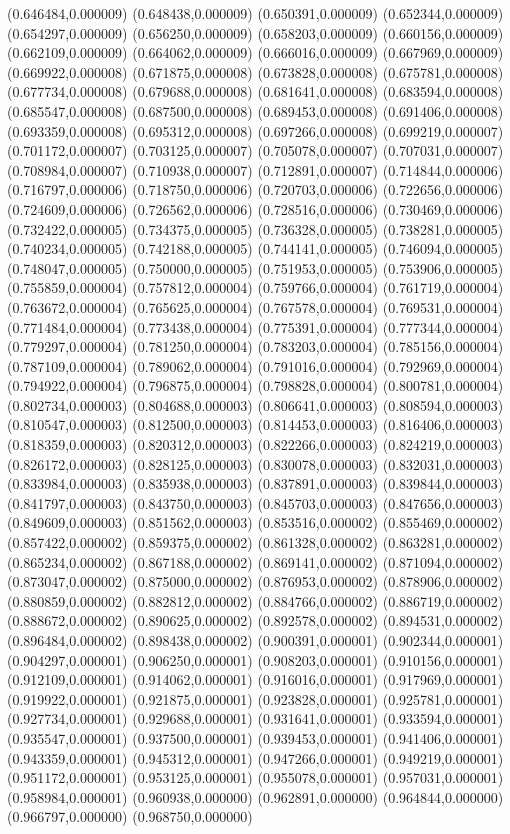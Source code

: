 {(0.646484,0.000009) (0.648438,0.000009) (0.650391,0.000009) (0.652344,0.000009) (0.654297,0.000009) (0.656250,0.000009) (0.658203,0.000009) (0.660156,0.000009) (0.662109,0.000009) (0.664062,0.000009) (0.666016,0.000009) (0.667969,0.000009) (0.669922,0.000008) (0.671875,0.000008) (0.673828,0.000008) (0.675781,0.000008) (0.677734,0.000008) (0.679688,0.000008) (0.681641,0.000008) (0.683594,0.000008) (0.685547,0.000008) (0.687500,0.000008) (0.689453,0.000008) (0.691406,0.000008) (0.693359,0.000008) (0.695312,0.000008) (0.697266,0.000008) (0.699219,0.000007) (0.701172,0.000007) (0.703125,0.000007) (0.705078,0.000007) (0.707031,0.000007) (0.708984,0.000007) (0.710938,0.000007) (0.712891,0.000007) (0.714844,0.000006) (0.716797,0.000006) (0.718750,0.000006) (0.720703,0.000006) (0.722656,0.000006) (0.724609,0.000006) (0.726562,0.000006) (0.728516,0.000006) (0.730469,0.000006) (0.732422,0.000005) (0.734375,0.000005) (0.736328,0.000005) (0.738281,0.000005) (0.740234,0.000005) (0.742188,0.000005) (0.744141,0.000005) (0.746094,0.000005) (0.748047,0.000005) (0.750000,0.000005) (0.751953,0.000005) (0.753906,0.000005) (0.755859,0.000004) (0.757812,0.000004) (0.759766,0.000004) (0.761719,0.000004) (0.763672,0.000004) (0.765625,0.000004) (0.767578,0.000004) (0.769531,0.000004) (0.771484,0.000004) (0.773438,0.000004) (0.775391,0.000004) (0.777344,0.000004) (0.779297,0.000004) (0.781250,0.000004) (0.783203,0.000004) (0.785156,0.000004) (0.787109,0.000004) (0.789062,0.000004) (0.791016,0.000004) (0.792969,0.000004) (0.794922,0.000004) (0.796875,0.000004) (0.798828,0.000004) (0.800781,0.000004) (0.802734,0.000003) (0.804688,0.000003) (0.806641,0.000003) (0.808594,0.000003) (0.810547,0.000003) (0.812500,0.000003) (0.814453,0.000003) (0.816406,0.000003) (0.818359,0.000003) (0.820312,0.000003) (0.822266,0.000003) (0.824219,0.000003) (0.826172,0.000003) (0.828125,0.000003) (0.830078,0.000003) (0.832031,0.000003) (0.833984,0.000003) (0.835938,0.000003) (0.837891,0.000003) (0.839844,0.000003) (0.841797,0.000003) (0.843750,0.000003) (0.845703,0.000003) (0.847656,0.000003) (0.849609,0.000003) (0.851562,0.000003) (0.853516,0.000002) (0.855469,0.000002) (0.857422,0.000002) (0.859375,0.000002) (0.861328,0.000002) (0.863281,0.000002) (0.865234,0.000002) (0.867188,0.000002) (0.869141,0.000002) (0.871094,0.000002) (0.873047,0.000002) (0.875000,0.000002) (0.876953,0.000002) (0.878906,0.000002) (0.880859,0.000002) (0.882812,0.000002) (0.884766,0.000002) (0.886719,0.000002) (0.888672,0.000002) (0.890625,0.000002) (0.892578,0.000002) (0.894531,0.000002) (0.896484,0.000002) (0.898438,0.000002) (0.900391,0.000001) (0.902344,0.000001) (0.904297,0.000001) (0.906250,0.000001) (0.908203,0.000001) (0.910156,0.000001) (0.912109,0.000001) (0.914062,0.000001) (0.916016,0.000001) (0.917969,0.000001) (0.919922,0.000001) (0.921875,0.000001) (0.923828,0.000001) (0.925781,0.000001) (0.927734,0.000001) (0.929688,0.000001) (0.931641,0.000001) (0.933594,0.000001) (0.935547,0.000001) (0.937500,0.000001) (0.939453,0.000001) (0.941406,0.000001) (0.943359,0.000001) (0.945312,0.000001) (0.947266,0.000001) (0.949219,0.000001) (0.951172,0.000001) (0.953125,0.000001) (0.955078,0.000001) (0.957031,0.000001) (0.958984,0.000001) (0.960938,0.000000) (0.962891,0.000000) (0.964844,0.000000) (0.966797,0.000000) (0.968750,0.000000) }
